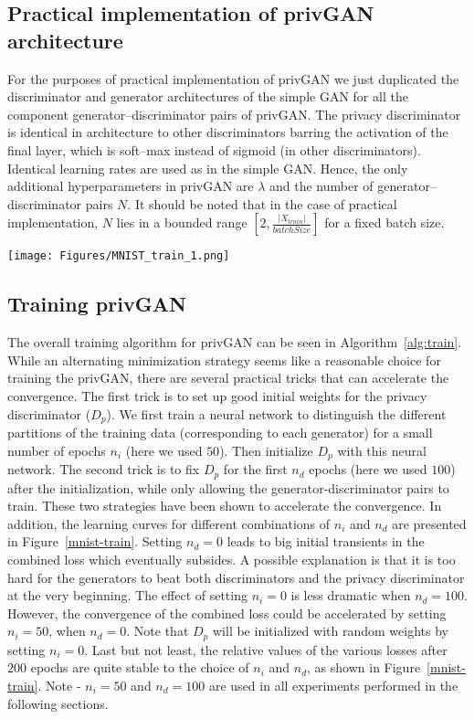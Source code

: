 \documentclass{article}
\begin{document}
\subsection{Practical implementation of privGAN architecture}
For the purposes of practical implementation of privGAN we just duplicated the discriminator and generator architectures of the simple GAN  for all the component generator--discriminator pairs of privGAN.  The privacy discriminator is identical in architecture to other discriminators barring the activation of the final layer, which is soft--max instead of sigmoid (in other discriminators). Identical learning rates are used as in the simple GAN. Hence, the only additional hyperparameters in privGAN are $\lambda$ and the number of generator--discriminator pairs $N$. It should be noted that in the case of practical implementation, $N$ lies in a bounded range $[2,\frac{|X_{train}|}{batchSize}]$ for a fixed batch size.
\begin{figure*}[h!]
    \centering
    \texttt{[image: Figures/MNIST\_train\_1.png]}
    \caption{Comparing the loss convergence for different model training hyperparameters of privGAN on the MNIST dataset with $\lambda=1$. }
    \label{mnist-train}
\end{figure*}

\subsection{Training privGAN}
The overall training algorithm for privGAN can be seen in Algorithm~\ref{alg:train}. While an alternating minimization strategy seems like a reasonable choice for training the privGAN, there are several practical tricks that can accelerate the convergence. The first trick is to set up good initial weights for the privacy discriminator ($D_p$). We first train a neural network to distinguish the different partitions of the training data (corresponding to each generator) for a small number of epochs $n_i$ (here we used $50$). Then initialize $D_p$ with this neural network. The second trick is to fix $D_p$ for the first $n_d$ epochs (here we used $100$) after the initialization, while only allowing the generator-discriminator pairs to train. These two strategies have been shown to accelerate the convergence. In addition, the learning curves for different combinations of $n_i$ and $n_d$ are presented in Figure~\ref{mnist-train}. Setting $n_d=0$ leads to big initial transients in the combined loss which eventually subsides. A possible explanation is that it is too hard for the generators to beat both discriminators and the privacy discriminator at the very beginning. The effect of setting $n_i=0$ is less dramatic when $n_d=100$. However, the convergence of the combined loss could be accelerated by setting $n_i=50$, when $n_d = 0$. Note that $D_p$ will be initialized with random weights by setting $n_i=0$. Last but not least, the relative values of the various losses after $200$ epochs are quite stable to the choice of $n_i$ and $n_d$, as shown in Figure~\ref{mnist-train}. Note - $n_i=50$ and $n_d=100$ are used in all experiments performed in the following sections. 
\end{document}
